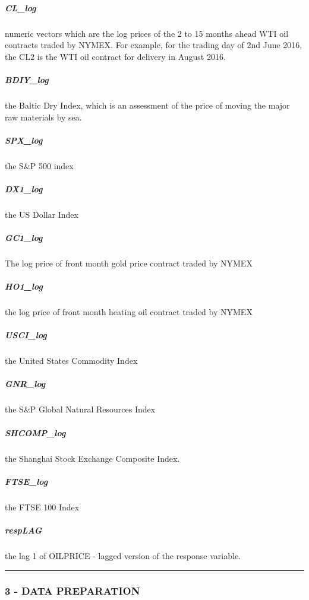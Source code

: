 \documentclass[
]{article}
\begin{document}
\hypertarget{cl_log}{%
\subparagraph{CL\_log}\label{cl_log}}

numeric vectors which are the log prices of the 2 to 15 months ahead WTI
oil contracts traded by NYMEX. For example, for the trading day of 2nd
June 2016, the CL2 is the WTI oil contract for delivery in August 2016.

\hypertarget{bdiy_log}{%
\subparagraph{BDIY\_log}\label{bdiy_log}}

the Baltic Dry Index, which is an assessment of the price of moving the
major raw materials by sea.

\hypertarget{spx_log}{%
\subparagraph{SPX\_log}\label{spx_log}}

the S\&P 500 index

\hypertarget{dx1_log}{%
\subparagraph{DX1\_log}\label{dx1_log}}

the US Dollar Index

\hypertarget{gc1_log}{%
\subparagraph{GC1\_log}\label{gc1_log}}

The log price of front month gold price contract traded by NYMEX

\hypertarget{ho1_log}{%
\subparagraph{HO1\_log}\label{ho1_log}}

the log price of front month heating oil contract traded by NYMEX

\hypertarget{usci_log}{%
\subparagraph{USCI\_log}\label{usci_log}}

the United States Commodity Index

\hypertarget{gnr_log}{%
\subparagraph{GNR\_log}\label{gnr_log}}

the S\&P Global Natural Resources Index

\hypertarget{shcomp_log}{%
\subparagraph{SHCOMP\_log}\label{shcomp_log}}

the Shanghai Stock Exchange Composite Index.

\hypertarget{ftse_log}{%
\subparagraph{FTSE\_log}\label{ftse_log}}

the FTSE 100 Index

\hypertarget{resplag}{%
\subparagraph{respLAG}\label{resplag}}

the lag 1 of OILPRICE - lagged version of the response variable.

\begin{center}\rule{0.5\linewidth}{0.5pt}\end{center}

\hypertarget{data-preparation}{%
\subsubsection{3 - DATA PREPARATION}\label{data-preparation}}
\end{document}

